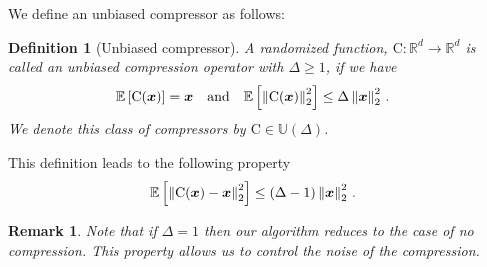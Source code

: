 \documentclass[twoside]{article}
\newtheorem{remark}{Remark}
\newtheorem{definition}{Definition}
\begin{document}
We define an unbiased compressor as follows:
\begin{definition}[Unbiased compressor]
A randomized function, $\text{C}:\mathbb{R}^{d}\rightarrow\mathbb{R}^{d}$ is called an unbiased compression operator with $\Delta\geq 1$, if we have 
\begin{align}\notag
\mathbb{E}\left[\text{C}(\boldsymbol{x})\right]&=\boldsymbol{x}\nonumber \quad \textrm{and} \quad    \mathbb{E}\left[\left\|\text{C}(\boldsymbol{x})\right\|^2_2\right] \leq \Delta\left\|\boldsymbol{x}\right\|^2_2\notag \, .
\end{align}
We denote this class of compressors by $\text{C}\in\mathbb{U}(\Delta)$.
\end{definition}
This definition leads to the following property 
\begin{align}\notag
    \mathbb{E}\left[\left\|\text{C}(\boldsymbol{x})-\boldsymbol{x}\right\|^2_2\right]&\leq \left(\Delta-1\right)\left\|\boldsymbol{x}\right\|^2_2\, .
\end{align}
\begin{remark}
Note that if $\Delta=1$ then our algorithm reduces to the case of no compression. 
This property allows us to control the noise of the compression.
\end{remark}
\end{document}
